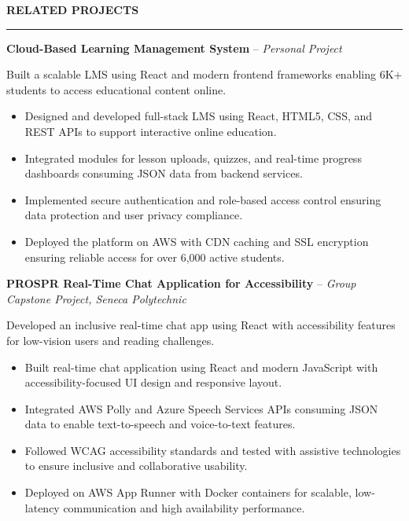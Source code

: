 \documentclass[10pt,letterpaper]{article}
\begin{document}
\vspace{6pt}

\textbf{RELATED PROJECTS}\\[-8pt]
\noindent\rule{\textwidth}{1pt}

\vspace{-2pt}

\textbf{Cloud-Based Learning Management System} -- \emph{Personal Project}

\vspace{-1pt}

Built a scalable LMS using React and modern frontend frameworks enabling 6K+ students to access educational content online.
\vspace{-1pt}
\begin{itemize}
\item Designed and developed full-stack LMS using React, HTML5, CSS, and REST APIs to support interactive online education.
\item Integrated modules for lesson uploads, quizzes, and real-time progress dashboards consuming JSON data from backend services.
\item Implemented secure authentication and role-based access control ensuring data protection and user privacy compliance.
\item Deployed the platform on AWS with CDN caching and SSL encryption ensuring reliable access for over 6,000 active students.
\end{itemize}

\textbf{PROSPR  Real-Time Chat Application for Accessibility} -- \emph{Group Capstone Project, Seneca Polytechnic }

\vspace{-1pt}

Developed an inclusive real-time chat app using React with accessibility features for low-vision users and reading challenges.
\vspace{-1pt}
\begin{itemize}
\item Built real-time chat application using React and modern JavaScript with accessibility-focused UI design and responsive layout.
\item Integrated AWS Polly and Azure Speech Services APIs consuming JSON data to enable text-to-speech and voice-to-text features.
\item Followed WCAG accessibility standards and tested with assistive technologies to ensure inclusive and collaborative usability.
\item Deployed on AWS App Runner with Docker containers for scalable, low-latency communication and high availability performance.
\end{itemize}
\end{document}
